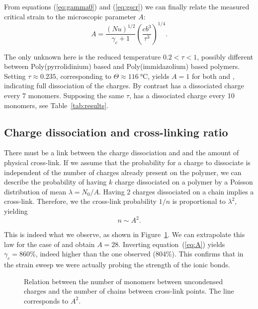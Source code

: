 \documentclass[12pt,a4paper,prl,reprint]{revtex4-1}
\begin{document}
From equations (\ref{eq:gamma0}) and (\ref{eq:gscr}) we can finally relate the measured critical strain to the microscopic parameter $A$:
\begin{equation}
A = \frac{\left(N u\right)^{1/2}}{\gamma_c+1}\left(\frac{c b^3}{\tau^3}\right)^{1/4}.
\label{eq:A}
\end{equation}

The only unknown here is the reduced temperature $0.2<\tau<1$, possibly different between Poly(pyrrolidinium) based and Poly(immidazolium) based polymers. Setting $\tau\approx 0.235$, corresponding to $\Theta\approx\SI{116}{\celsius}$, yields $A=1$ for both  and , indicating full dissociation of the charges. By contrast  has a dissociated charge every 7 monomers. Supposing the same $\tau$,  has a dissociated charge every 10 monomers, see Table~\ref{tab:results}.

\subsection{Charge dissociation and cross-linking ratio}

There must be a link between the charge dissociation and and the amount of physical cross-link. If we assume that the probability for a charge to dissociate is independent of the number of charges already present on the polymer, we can describe the probability of having $k$ charge dissociated on a polymer by a Poisson distribution of mean $\lambda = N_0/A$. Having 2 charges dissociated on a chain implies a cross-link. Therefore, we the cross-link probability $1/n$ is proportional to $\lambda^2$, yielding
\begin{equation}
n \sim A^2.
\end{equation}

This is indeed what we observe, as shown in Figure~\ref{fig:nA}. We can extrapolate this law for the case of  and obtain $A = 28$. Inverting equation~(\ref{eq:A}) yields $\gamma_c = 860\%$, indeed higher than the one observed (804\%). This confirms that in the  strain sweep we were actually probing the strength of the ionic bonds.

\begin{figure}
\begin{center}
\end{center}
\caption{Relation between the number of monomers between uncondensed charges and the number of chains between cross-link points. The line corresponds to $A^2$.}
\label{fig:nA}
\end{figure}



\end{document}
